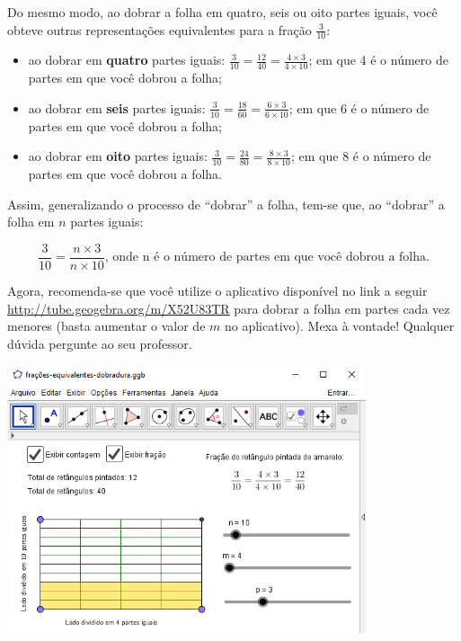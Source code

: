 \begin{refletindo*}
Do mesmo modo, ao dobrar a folha em quatro, seis ou oito partes iguais, você obteve outras representações equivalentes para a fração $\frac{3}{10}$:
\begin{itemize} %
  \item     ao dobrar em     {\bf quatro}     partes iguais:     $\frac{3}{10} = \frac{12}{40} = \frac{4 \times 3}{4 \times 10}$; em que 4 é o número de partes em que você dobrou a folha;
  \item     ao dobrar em     {\bf seis}     partes iguais:     $\frac{3}{10} = \frac{18}{60} = \frac{6 \times 3}{6 \times 10}$; em que 6 é o número de partes em que você dobrou a folha;
  \item     ao dobrar em     {\bf oito}     partes iguais:     $\frac{3}{10} = \frac{24}{80} = \frac{8 \times 3}{8 \times 10}$; em que 8 é o número de partes em que você dobrou a folha.
\end{itemize} %


Assim, generalizando o processo de ``dobrar'' a folha, tem-se que, ao ``dobrar'' a folha em $n$ partes iguais:

$$\dfrac{3}{10}=\dfrac{n \times 3}{n \times 10}\text{, onde n é o número de partes em que você dobrou a folha.}$$

Agora, recomenda-se que você utilize o aplicativo disponível no link a seguir \url{http://tube.geogebra.org/m/X52U83TR} para dobrar a folha em partes cada vez menores (basta aumentar o valor de $m$ no aplicativo). Mexa à vontade! Qualquer dúvida pergunte ao seu professor.
\begin{center}
\includegraphics[width=300pt, keepaspectratio]{..//media//cap4/secoes/dobradura-geogebra.png}
\end{center}
\end{refletindo*}


